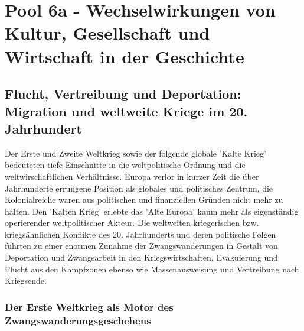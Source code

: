 \documentclass[letterpaper, 12pt]{article}
\let\tempsection\section
\renewcommand\section[1]{\vspace{-0.3cm}\tempsection{#1}\vspace{-0.3cm}}
\let\tempsubsection\subsection
\renewcommand\subsection[1]{\vspace{0cm}\tempsubsection{#1}\vspace{0cm}}
\let\tempsubsubsection\subsubsection
\renewcommand\subsubsection[1]{\vspace{0cm}\tempsubsubsection{#1}\vspace{0cm}}
\begin{document}
\parindent 0pt
\parskip 6pt



\clearpage
\thispagestyle{empty}
\tableofcontents

\newpage
{}
\pagestyle{fancy}


\section{Pool 6a - Wechselwirkungen von Kultur, Gesellschaft und Wirtschaft in der Geschichte \cite{buch}}

\subsection{Flucht, Vertreibung und Deportation: Migration und weltweite Kriege im 20. Jahrhundert}

Der Erste und Zweite Weltkrieg sowie der folgende globale 'Kalte Krieg' bedeuteten tiefe Einschnitte in die weltpolitische Ordnung und die weltwirschaftlichen Verhältnisse. Europa verlor in kurzer Zeit die über Jahrhunderte errungene Position als globales und politisches Zentrum, die Kolonialreiche waren aus politischen und finanziellen Gründen nicht mehr zu halten. Den 'Kalten Krieg' erlebte das 'Alte Europa' kaum mehr als eigenständig operierender weltpolitischer Akteur. Die weltweiten kriegerischen bzw. kriegsähnlichen Konflikte des 20. Jahrhunderts und deren politische Folgen führten zu einer enormen Zunahme der Zwangswanderungen in Gestalt von Deportation und Zwangsarbeit in den Kriegswirtschaften, Evakuierung und Flucht aus den Kampfzonen ebenso wie Massenausweisung und Vertreibung nach Kriegsende.

\subsubsection{Der Erste Weltkrieg als Motor des Zwangswanderungsgeschehens}
\end{document}
